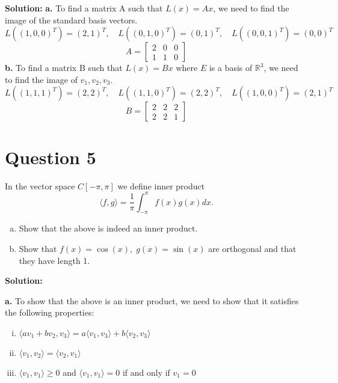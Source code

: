 \documentclass{article}
\begin{document}
\noindent\textbf{Solution:}
\newline\noindent\textbf{a.} To find a matrix A such that $L(x) = Ax$, we need to find the image of the standard basis vectors.
$$ L((1, 0, 0)^T) = (2, 1)^T, \quad L((0, 1, 0)^T) = (0, 1)^T, \quad L((0, 0, 1)^T) = (0, 0)^T $$
$$ A = \begin{bmatrix} 2 & 0 & 0 \\ 1 & 1 & 0 \end{bmatrix} $$
\noindent\textbf{b.} To find a matrix B such that $L(x) = Bx$ where $E$ is a basis of $\mathbb{R}^3$, we need to find the image of $v_1, v_2, v_3$.
$$ L((1, 1, 1)^T) = (2, 2)^T, \quad L((1, 1, 0)^T) = (2, 2)^T, \quad L((1, 0, 0)^T) = (2, 1)^T $$
$$ B = \begin{bmatrix} 2 & 2 & 2 \\ 2 & 2 & 1 \end{bmatrix} $$

\section*{Question 5}
In the vector space $C[-\pi, \pi]$ we define inner product
$$ \langle f, g \rangle = \frac{1}{\pi} \int_{-\pi}^{\pi} f(x)g(x)dx. $$
\begin{enumerate}[a.]
    \item Show that the above is indeed an inner product.
    \item Show that $f(x) = \cos(x), \; g(x) = \sin(x)$ are orthogonal and that they have length 1.
\end{enumerate}

\noindent\textbf{Solution:}

\vspace{0.25cm}
\noindent\textbf{a.} To show that the above is an inner product, we need to show that it satisfies the following properties:
\begin{enumerate}[i.]
    \item $\langle av_1 + bv_2, v_3 \rangle = a\langle v_1, v_3 \rangle + b\langle v_2, v_3 \rangle$
    \item $\langle v_1, v_2 \rangle = \langle v_2, v_1 \rangle$
    \item $\langle v_1, v_1 \rangle \geq 0$ and $\langle v_1, v_1 \rangle = 0$ if and only if $v_1 = 0$
\end{enumerate}
\end{document}

